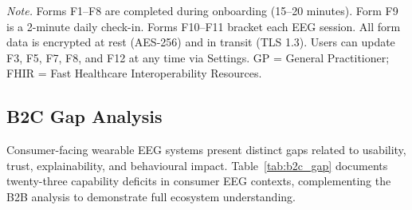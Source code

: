 \vspace{0.5em}
\noindent\textit{Note.} Forms F1--F8 are completed during onboarding (15--20 minutes). Form F9 is a 2-minute daily check-in. Forms F10--F11 bracket each EEG session. All form data is encrypted at rest (AES-256) and in transit (TLS 1.3). Users can update F3, F5, F7, F8, and F12 at any time via Settings. GP = General Practitioner; FHIR = Fast Healthcare Interoperability Resources.
\fi %
\fi %

\label{sec:b2c_forms}
\label{tab:b2c_user_forms}

\iffalse
\subsection{B2C Gap Analysis}
\label{sec:b2c_gap}

Consumer-facing wearable EEG systems present distinct gaps related to usability, trust, explainability, and behavioural impact. Table~\ref{tab:b2c_gap} documents twenty-three capability deficits in consumer EEG contexts, complementing the B2B analysis to demonstrate full ecosystem understanding.


